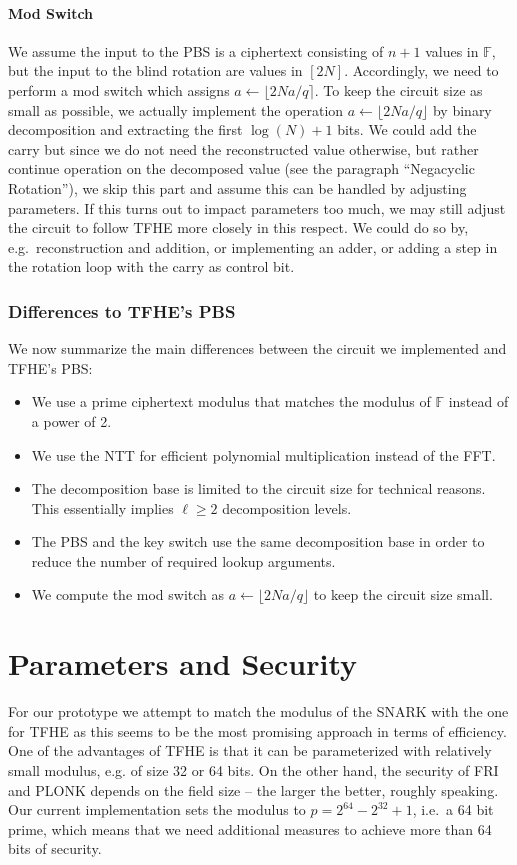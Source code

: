 \documentclass[final]{zamarep}
\newcommand{\field}{\mathbb{F}}
\begin{document}
\paragraph{Mod Switch}
We assume the input to the PBS is a ciphertext consisting of $n + 1$ values in $\field$, but the input to the blind rotation are values in $[2N]$. Accordingly, we need to perform a mod switch which assigns $a \gets \lfloor 2N a / q \rceil$. To keep the circuit size as small as possible, we actually implement the operation $a \gets \lfloor 2N a / q \rfloor$ by binary decomposition and extracting the first $\log(N) + 1$ bits. We could add the carry but since we do not need the reconstructed value otherwise, but rather continue operation on the decomposed value (see the paragraph ``Negacyclic Rotation''), we skip this part and assume this can be handled by adjusting parameters. If this turns out to impact parameters too much, we may still adjust the circuit to follow TFHE more closely in this respect. We could do so by, e.g.\ reconstruction and addition, or implementing an adder, or adding a step in the rotation loop with the carry as control bit.

\subsubsection{Differences to TFHE's PBS}
\label{sec:diff}

We now summarize the main differences between the circuit we implemented and TFHE's PBS:
\begin{itemize}
\item We use a prime ciphertext modulus that matches the modulus of $\field$ instead of a power of 2.
\item We use the NTT for efficient polynomial multiplication instead of the FFT.
\item The decomposition base is limited to the circuit size for technical reasons. This essentially implies $\ell \geq 2$ decomposition levels.
\item The PBS and the key switch use the same decomposition base in order to reduce the number of required lookup arguments.
\item We compute the mod switch as $a \gets \lfloor 2N a / q \rfloor$ to keep the circuit size small.
\end{itemize}

\section{Parameters and Security}
\label{sec:security}
For our prototype we attempt to match the modulus of the SNARK with the one for TFHE as this seems to be the most promising approach in terms of efficiency. One of the advantages of TFHE is that it can be parameterized with relatively small modulus, e.g. of size 32 or 64 bits. On the other hand, the security of FRI and PLONK depends on the field size -- the larger the better, roughly speaking. Our current implementation sets the modulus to $p=2^{64} - 2^{32} + 1$, i.e.\ a 64 bit prime, which means that we need additional measures to achieve more than 64 bits of security.
\end{document}
